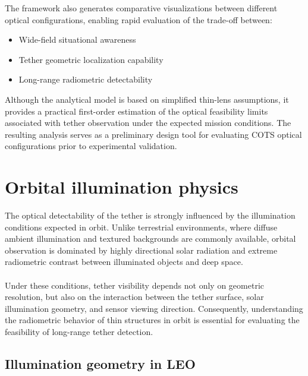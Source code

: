 The framework also generates comparative visualizations between different optical configurations, enabling rapid evaluation of the trade-off between:

\begin{itemize}
    \item Wide-field situational awareness
    \item Tether geometric localization capability
    \item Long-range radiometric detectability
\end{itemize}

Although the analytical model is based on simplified thin-lens assumptions, it provides a practical first-order estimation of the optical feasibility limits associated with tether observation under the expected mission conditions. The resulting analysis serves as a preliminary design tool for evaluating COTS optical configurations prior to experimental validation.

\section{Orbital illumination physics}

The optical detectability of the tether is strongly influenced by the illumination conditions expected in orbit. Unlike terrestrial environments, where diffuse ambient illumination and textured backgrounds are commonly available, orbital observation is dominated by highly directional solar radiation and extreme radiometric contrast between illuminated objects and deep space.
\\\\
Under these conditions, tether visibility depends not only on geometric resolution, but also on the interaction between the tether surface, solar illumination geometry, and sensor viewing direction. Consequently, understanding the radiometric behavior of thin structures in orbit is essential for evaluating the feasibility of long-range tether detection.

\subsection{Illumination geometry in LEO}

